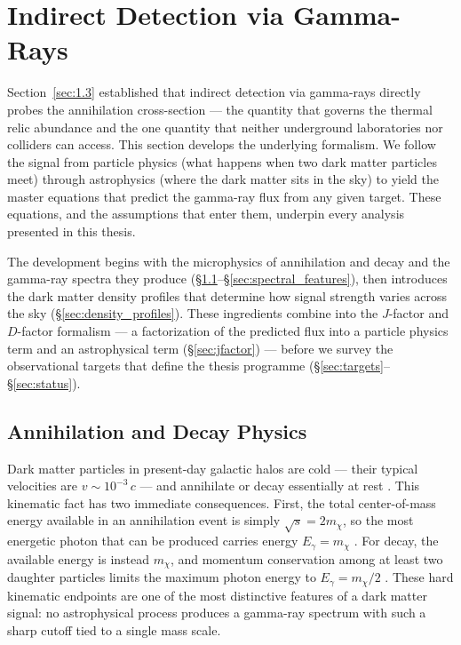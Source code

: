 
\section{Indirect Detection via Gamma-Rays}
\label{sec:1.4}

Section~\ref{sec:1.3} established that indirect detection via gamma-rays directly probes the annihilation cross-section --- the quantity that governs the thermal relic abundance and the one quantity that neither underground laboratories nor colliders can access.
This section develops the underlying formalism.
We follow the signal from particle physics (what happens when two dark matter particles meet) through astrophysics (where the dark matter sits in the sky) to yield the master equations that predict the gamma-ray flux from any given target.
These equations, and the assumptions that enter them, underpin every analysis presented in this thesis.

The development begins with the microphysics of annihilation and decay and the gamma-ray spectra they produce (\S\ref{sec:ann_decay}--\S\ref{sec:spectral_features}), then introduces the dark matter density profiles that determine how signal strength varies across the sky (\S\ref{sec:density_profiles}).
These ingredients combine into the $J$-factor and $D$-factor formalism --- a factorization of the predicted flux into a particle physics term and an astrophysical term (\S\ref{sec:jfactor}) --- before we survey the observational targets that define the thesis programme (\S\ref{sec:targets}--\S\ref{sec:status}).

\subsection{Annihilation and Decay Physics}
\label{sec:ann_decay}

Dark matter particles in present-day galactic halos are cold --- their typical velocities are $v \sim 10^{-3}\, c$ --- and annihilate or decay essentially at rest \cite{Cirelli:2024ssz}.
This kinematic fact has two immediate consequences.
First, the total center-of-mass energy available in an annihilation event is simply $\sqrt{s} = 2 m_\chi$, so the most energetic photon that can be produced carries energy $E_\gamma = m_\chi$ \cite{Cirelli:2024ssz}.
For decay, the available energy is instead $m_\chi$, and momentum conservation among at least two daughter particles limits the maximum photon energy to $E_\gamma = m_\chi / 2$ \cite{Cirelli:2024ssz,Pinetti:2021jjs}.
These hard kinematic endpoints are one of the most distinctive features of a dark matter signal: no astrophysical process produces a gamma-ray spectrum with such a sharp cutoff tied to a single mass scale.

